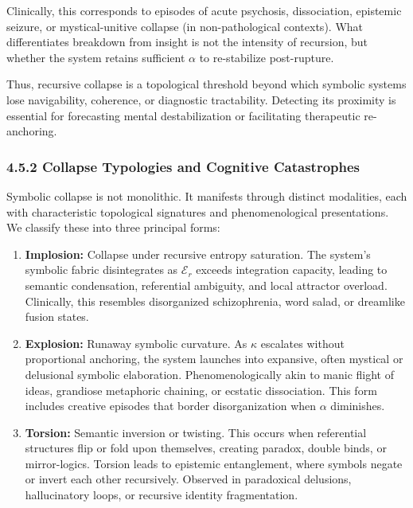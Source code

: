 Clinically, this corresponds to episodes of acute psychosis, dissociation, epistemic seizure, or mystical-unitive collapse (in non-pathological contexts). What differentiates breakdown from insight is not the intensity of recursion, but whether the system retains sufficient $\alpha$ to re-stabilize post-rupture.

Thus, recursive collapse is a topological threshold beyond which symbolic systems lose navigability, coherence, or diagnostic tractability. Detecting its proximity is essential for forecasting mental destabilization or facilitating therapeutic re-anchoring.

\subsubsection*{4.5.2 Collapse Typologies and Cognitive Catastrophes}

Symbolic collapse is not monolithic. It manifests through distinct modalities, each with characteristic topological signatures and phenomenological presentations. We classify these into three principal forms:

\begin{enumerate}
  \item \textbf{Implosion:} Collapse under recursive entropy saturation. The system’s symbolic fabric disintegrates as $\mathcal{E}_r$ exceeds integration capacity, leading to semantic condensation, referential ambiguity, and local attractor overload. Clinically, this resembles disorganized schizophrenia, word salad, or dreamlike fusion states.
  
  \item \textbf{Explosion:} Runaway symbolic curvature. As $\kappa$ escalates without proportional anchoring, the system launches into expansive, often mystical or delusional symbolic elaboration. Phenomenologically akin to manic flight of ideas, grandiose metaphoric chaining, or ecstatic dissociation. This form includes creative episodes that border disorganization when $\alpha$ diminishes.
  
  \item \textbf{Torsion:} Semantic inversion or twisting. This occurs when referential structures flip or fold upon themselves, creating paradox, double binds, or mirror-logics. Torsion leads to epistemic entanglement, where symbols negate or invert each other recursively. Observed in paradoxical delusions, hallucinatory loops, or recursive identity fragmentation.
\end{enumerate}

